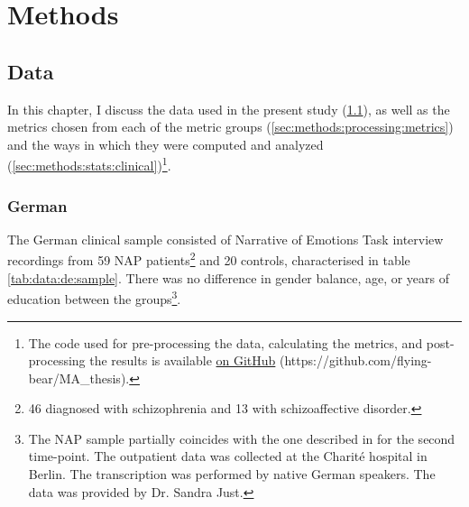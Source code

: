 
\chapter{Methods} %

\label{chap:3:methods} 

\section{Data}
\label{sec:methods:data:clinical}

In this chapter, I discuss the data used in the present study (\ref{sec:methods:data:clinical}), as well as the metrics chosen from each of the metric groups (\ref{sec:methods:processing:metrics}) and the ways in which they were computed and analyzed (\ref{sec:methods:stats:clinical})\footnote{The code used for pre-processing the data, calculating the metrics, and post-processing the results is available \href{https://github.com/flying-bear/MA_thesis}{on GitHub} (https://github.com/flying-bear/MA\_thesis).}.

\subsection{German}
\label{sec:methods:data:clinical:german}

The German clinical sample consisted of Narrative of Emotions Task \citep{buck2014net} interview recordings from 59 NAP patients\footnote{46 diagnosed with schizophrenia and 13 with schizoaffective disorder.} and 20 controls, characterised in table \ref{tab:data:de:sample}. There was no difference in gender balance, age, or years of education between the groups\footnote{The NAP sample partially coincides with the one described in \citet{just2023validation} for the second time-point. The outpatient data was collected at the Charité hospital in Berlin. The transcription was performed by native German speakers. The data was provided by Dr. Sandra Just.}.

